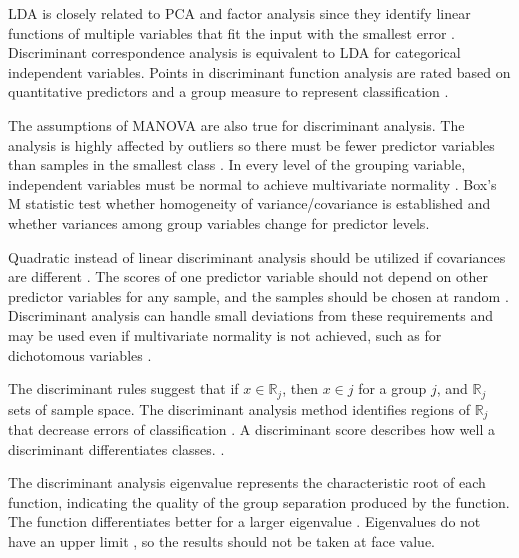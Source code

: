\documentclass[sn-mathphys-num]{sn-jnl}%
\begin{document}
LDA is closely related to PCA and factor analysis since they identify linear functions of multiple variables that fit the input with the smallest error \cite{martinez2001pca}. Discriminant correspondence analysis \cite{abdi2007discriminant, perriere2003use} is equivalent to LDA for categorical independent variables. Points in discriminant function analysis are rated based on quantitative predictors and a group measure \cite{cokluk2008discriminant} to represent classification \cite{venables2013modern}.

The assumptions of MANOVA are also true for discriminant analysis. The analysis is highly affected by outliers so there must be fewer predictor variables than samples in the smallest class \cite{cokluk2008discriminant}. In every level of the grouping variable, independent variables must be normal to achieve multivariate normality \cite{cokluk2008discriminant, hansen2005using}. Box's M statistic \cite{hansen2005using} test whether homogeneity of variance/covariance is established and whether variances among group variables change for predictor levels. 

Quadratic instead of linear discriminant analysis should be utilized if covariances are different \cite{cokluk2008discriminant}. The scores of one predictor variable should not depend on other predictor variables for any sample, and the samples should be chosen at random \cite{cokluk2008discriminant, hansen2005using}. Discriminant analysis can handle small deviations from these requirements \cite{lachenbruch1979discriminant} and may be used even if multivariate normality is not achieved, such as for dichotomous variables \cite{klecka1980discriminant}.

The discriminant rules suggest that if $x\in \mathbb{R}_{j}$, then $x\in j$ for a group $j$, and $\mathbb{R}_{j}$ sets of sample space. The discriminant analysis method identifies regions of $\mathbb{R}_{j}$ that decrease errors of classification \cite{Hardle2003AppliedMS}. A discriminant score describes how well a discriminant differentiates classes. \cite{archive765Discriminant}.
 
The discriminant analysis eigenvalue represents the characteristic root of each function, indicating the quality of the group separation produced by the function. The function differentiates better for a larger eigenvalue \cite{cokluk2008discriminant}. Eigenvalues do not have an upper limit \cite{cokluk2008discriminant, hansen2005using}, so the results should not be taken at face value.
\end{document}
